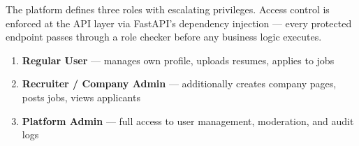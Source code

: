 The platform defines three roles with escalating privileges. Access control is enforced at the API layer via FastAPI's dependency injection — every protected endpoint passes through a role checker before any business logic executes.

\begin{enumerate}
    \item \textbf{Regular User} — manages own profile, uploads resumes, applies to jobs
    \item \textbf{Recruiter / Company Admin} — additionally creates company pages, posts jobs, views applicants
    \item \textbf{Platform Admin} — full access to user management, moderation, and audit logs
\end{enumerate}
